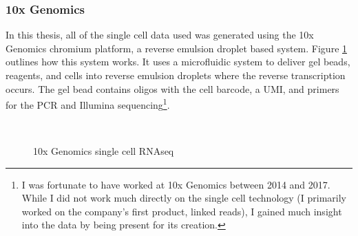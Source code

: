 \subsubsection{10x Genomics}

\par{
In this thesis, all of the single cell data used was generated using the 10x Genomics chromium platform, a reverse emulsion droplet based system. Figure \ref{figure:10xsinglecell} outlines how this system works. It uses a microfluidic system to deliver gel beads, reagents, and cells into reverse emulsion droplets where the reverse transcription occurs. The gel bead contains oligos with the cell barcode, a UMI, and primers for the PCR and Illumina sequencing\cite{10xsinglecell}\footnote{I was fortunate to have worked at 10x Genomics between 2014 and 2017. While I did not work much directly on the single cell technology (I primarily worked on the company's first product, linked reads), I gained much insight into the data by being present for its creation.}.
}
\begin{figure}[htbp!]
\caption{10x Genomics single cell RNAseq}
\label{figure:10xsinglecell}
\begin{centering}
 \\
\end{centering}
\end{figure}

